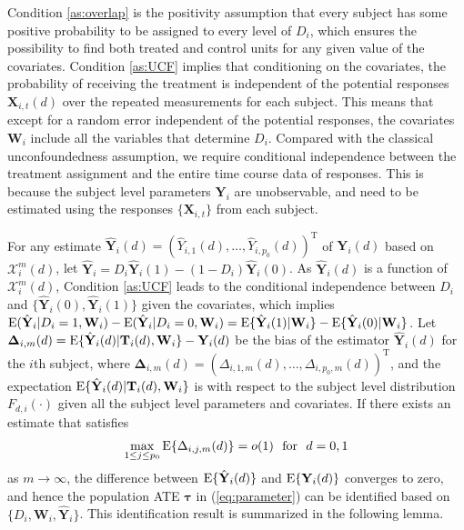 \documentclass[12pt]{article}
\def\be{\begin{equation}}
\def\ee{\end{equation}}
\def\T{{ \mathrm{\scriptscriptstyle T} }}
\theoremstyle{definition}
\newcommand{\E}{\rm E}
\newcommand{\bT}{{\mathbf T}}
\newcommand{\bW}{{\mathbf W}}
\newcommand{\bX}{{\mathbf X}}
\newcommand{\bY}{{\mathbf Y}}
\newcommand{\bDelta}{\boldsymbol{\Delta}}
\newcommand{\btau}{\boldsymbol{\tau}}
\begin{document}
Condition \ref{as:overlap} is the positivity assumption that every subject has some positive probability to be assigned to every level of $D_i$, which ensures the possibility to find both treated and control units for any given value of the covariates.
Condition \ref{as:UCF} implies that conditioning on the covariates, 
the probability of receiving the treatment is independent of the potential responses $\bX_{i, t}(d)$ over the repeated measurements 
for each subject.
This means that except for a random error independent of the potential responses, the covariates $\bW_{i}$ include all the variables that determine 
$D_{i}$. 
Compared with the classical unconfoundedness assumption, we require conditional independence between the treatment assignment and the entire time course data of responses. This is because the subject level parameters $\bY_{i}$ are unobservable, and need to be estimated using the responses $\{\bX_{i, t}\}$ from each subject. 

For any estimate $\hat{\bY}_{i}(d) = (\hat{Y}_{i, 1}(d), \ldots, \hat{Y}_{i, p_0}(d))^{\T}$ of $\bY_{i}(d)$ based on $\mathcal{X}_i^m(d)$, let $\hat{\bY}_{i} = D_i \hat{\bY}_{i}(1) - (1 - D_i) \hat{\bY}_{i}(0)$.
As $\hat{\bY}_{i}(d)$ is a function of $\mathcal{X}_i^m(d)$, Condition \ref{as:UCF} leads to the conditional independence between $D_i$ and $\{\hat{\bY}_{i}(0), \hat{\bY}_{i}(1)\}$ given the covariates, which implies 
${\E}(\hat{\bY}_{i} | D_i = 1, \bW_i) - {\E}(\hat{\bY}_{i} | D_i = 0, \bW_i) = {\E}\{\hat{\bY}_{i}(1) | \bW_i\} - {\E}\{\hat{\bY}_{i}(0) | \bW_i\}$.
Let $\bDelta_{i, m}(d) = {\E}\{\hat{\bY}_{i}(d) | \bT_i(d), \bW_i\} - \bY_{i}(d)$ be the bias of the estimator $\hat{\bY}_{i}(d)$ for the $i$th subject, where $\bDelta_{i, m}(d) = (\Delta_{i, 1, m}(d), \ldots, \Delta_{i, p_0, m}(d))^{\T}$, and the expectation ${\E}\{\hat{\bY}_{i}(d) | \bT_i(d), \bW_i\}$ is with respect to the subject level distribution $F_{d, i}(\cdot)$ given all the subject level parameters and covariates. 
If there exists an estimate that satisfies 
\be
\max_{1\leq j \leq p_0} {\E} \{\Delta_{i, j, m}(d)\} = o(1) \mbox{ \ for \ } d = 0, 1
\label{eq:unbiased}\ee
as $m \to \infty$, 
the difference between ${\E}\{\hat{\bY}_{i}(d)\}$ and ${\E}\{\bY_{i}(d)\}$ converges to zero, and hence the population ATE $\btau$ in (\ref{eq:parameter}) can be identified based on $\{D_i, \bW_i, \hat{\bY}_i\}$. This identification result is summarized in the following lemma.
\end{document}

